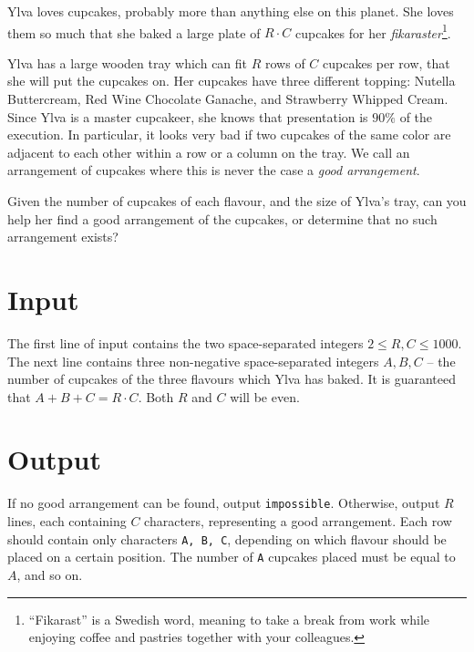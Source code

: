 Ylva loves cupcakes, probably more than anything else on this planet.
She loves them so much that she baked a large plate of $R \cdot C$ cupcakes for her \emph{fikaraster}\footnote{``Fikarast'' is a Swedish word, meaning to take a break from work while enjoying coffee and pastries together with your colleagues.}.

Ylva has a large wooden tray which can fit $R$ rows of $C$ cupcakes per row, that she will put the cupcakes on.
Her cupcakes have three different topping: Nutella Buttercream, Red Wine Chocolate Ganache, and Strawberry Whipped Cream.
Since Ylva is a master cupcakeer, she knows that presentation is $90\%$ of the execution.
In particular, it looks very bad if two cupcakes of the same color are adjacent to each other within a row or a column on the tray.
We call an arrangement of cupcakes where this is never the case a \emph{good arrangement}.

Given the number of cupcakes of each flavour, and the size of Ylva's tray, can you help her find a good arrangement of the cupcakes, or determine that no such arrangement exists?

\section*{Input}
The first line of input contains the two space-separated integers $2 \le R, C \le 1000$.
The next line contains three non-negative space-separated integers $A, B, C$ -- the number of cupcakes of the three flavours which Ylva has baked.
It is guaranteed that $A + B + C = R \cdot C$.
Both $R$ and $C$ will be even.

\section*{Output}
If no good arrangement can be found, output \texttt{impossible}.
Otherwise, output $R$ lines, each containing $C$ characters, representing a good arrangement.
Each row should contain only characters \texttt{A, B, C}, depending on which flavour should be placed on a certain position.
The number of \texttt{A} cupcakes placed must be equal to $A$, and so on.
